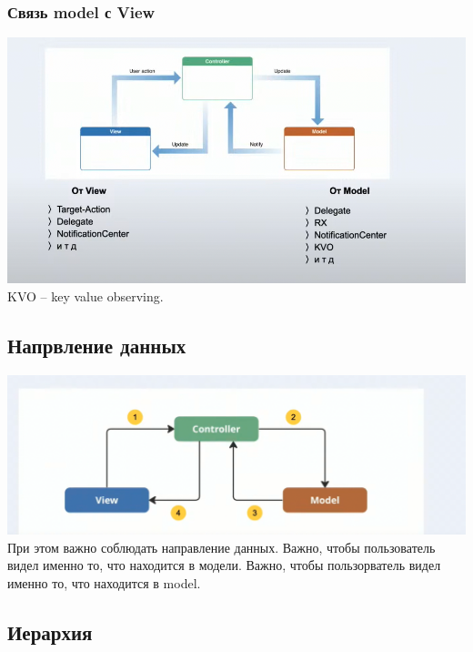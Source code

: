 \documentclass{article}
\begin{document}
    \subsubsection{Связь model с View}
    \includegraphics[scale = 0.4]{pic/Снимок экрана 2023-08-03 в 10.37.04.png}
    \newline
    KVO -- key value observing.
    \newline
    \subsection{Напрвление данных}
    \includegraphics[scale = 0.5]{pic/Снимок экрана 2023-08-03 в 10.38.07.png}
    \newline
    При этом важно соблюдать направление данных. Важно, чтобы пользователь видел именно то, что находится в модели. Важно, чтобы пользорватель видел именно то, что находится в model.
    \subsection{Иерархия}
\end{document}

